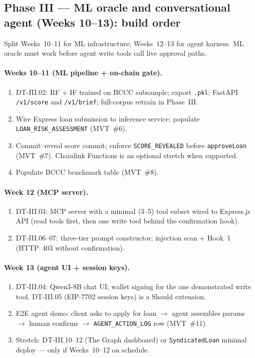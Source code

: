 \documentclass[12pt,a4paper]{report}
\begin{document}
\subsection{Phase III --- ML oracle and conversational agent (Weeks 10--13): build order}

Split Weeks~10--11 for ML infrastructure; Weeks~12--13 for agent harness. ML oracle must work before agent write tools call live approval paths.

\paragraph{Weeks 10--11 (ML pipeline + on-chain gate).}
\begin{enumerate}[noitemsep]
\item DT-III.02: RF + IF trained on BCCC subsample; export \texttt{.pkl}; FastAPI \texttt{/v1/score} and \texttt{/v1/brief}; full-corpus retrain in Phase~III.
\item Wire Express loan submission to inference service; populate \texttt{LOAN\_RISK\_ASSESSMENT} (MVT~\#6).
\item Commit--reveal score commit; enforce \texttt{SCORE\_REVEALED} before \texttt{approveLoan} (MVT~\#7). Chainlink Functions is an optional stretch when supported.
\item Populate BCCC benchmark table (MVT~\#8).
\end{enumerate}

\paragraph{Week 12 (MCP server).}
\begin{enumerate}[noitemsep]
\item DT-III.03: MCP server with a minimal (3--5) tool subset wired to Express.js API (read tools first, then one write tool behind the confirmation hook).
\item DT-III.06--07: three-tier prompt constructor; injection scan + Hook~1 (HTTP~403 without confirmation).
\end{enumerate}

\paragraph{Week 13 (agent UI + session keys).}
\begin{enumerate}[noitemsep]
\item DT-III.04: Qwen3-8B chat UI; wallet signing for the one demonstrated write tool. DT-III.05 (EIP-7702 session keys) is a Should extension.
\item E2E agent demo: client asks to apply for loan $\to$ agent assembles params $\to$ human confirms $\to$ \texttt{AGENT\_ACTION\_LOG} row (MVT~\#11).
\item Stretch: DT-III.10--12 (The Graph dashboard) or \texttt{SyndicatedLoan} minimal deploy --- only if Weeks~10--12 on schedule.
\end{enumerate}
\end{document}
